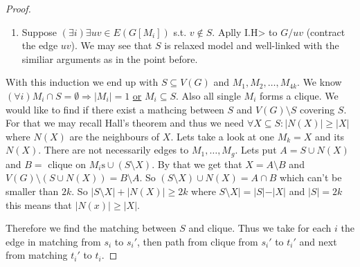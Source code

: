 \begin{proof}
\begin{enumerate}[(1)]
		\item Suppose $(\exists i) \exists uv \in E(G[M_{i}])$ s.t. $v \notin S$. Aplly I.H> to $G / uv$ (contract the edge $uv$). We may see that $S$ is relaxed model and well-linked with the similiar arguments as in the point before.
	\end{enumerate}
	
	With this induction we end up with $S \subseteq V(G)$ and $M_{1}, M_{2}, \dots, M_{4k}$. We know $(\forall i) M_{i} \cap S = \emptyset \Rightarrow |M_{i}| =1$ \underline{or} $M_{i} \subseteq S$. Also all single $M_{i}$ forms a clique. We would like to find if there exist a mathcing between $S$ and $V(G) \setminus S$ covering $S$. For that we may recall Hall's theorem and thus we need $\forall X \subseteq S: |N(X)| \geq |X|$ where $N(X)$ are the neighbours of $X$. Lets take a look at one $M_{k} = X$ and its $N(X)$. There are not necessarily edges to $M_{1}, \dots, M_{g}$. Lets put $A = S \cup N(X)$ and $B = \text{ clique on } M_{i}\text{s} \cup (S \setminus X)$. By that we get that $X = A \setminus B$ and $V(G) \setminus (S \cup N(X)) = B \setminus A$. So $(S \setminus X) \cup N(X) = A \cap B$ which can't be smaller than $2k$. So $|S \setminus X| + |N(X)| \geq 2k$ where $S \setminus X| = |S| - |X|$ and $|S| = 2k$ this means that $|N(x)| \geq |X|$.
	
	Therefore we find the matching between $S$ and clique. Thus we take for each $i$ the edge in matching from $s_{i}$ to $s_{i}'$, then path from clique from $s_{i}'$ to $t_{i}'$ and next from matching $t_{i}'$ to $t_{i}$.
\end{proof}